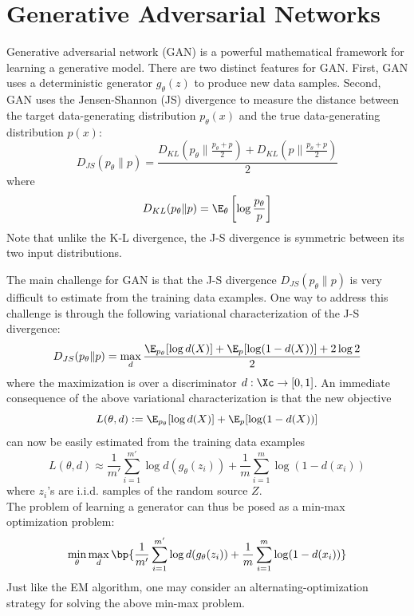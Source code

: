 \chapter{Generative Adversarial Networks}

Generative adversarial network (GAN) is a powerful mathematical framework for learning a generative model. There are two distinct features for GAN. First, GAN uses a deterministic generator $g_\theta(z)$ to produce new data samples.
Second, GAN uses the Jensen-Shannon (JS) divergence to measure the distance between the target data-generating distribution $p_\theta(x)$ and the true data-generating distribution $p(x)$:
\[
    D_{JS}(p_\theta \| p) = \frac{D_{KL}(p_\theta \| \frac{p_\theta + p}{2}) + D_{KL}(p \| \frac{p_\theta + p}{2})}{2}
\]
where
\[
    D_{KL}(p_\theta \| p) = \E_\theta \left[ \log \frac{p_\theta}{p} \right]
\]
Note that unlike the K-L divergence, the J-S divergence is symmetric between its two input distributions.

The main challenge for GAN is that the J-S divergence $D_{JS}(p_\theta \| p)$ is very difficult to estimate from the training data examples. One way to address this challenge is through the following variational characterization of the J-S divergence:
\[
    D_{JS}(p_\theta \| p) = \max_{d} \frac{\E_{p_{\theta}}[\log d(X)] + \E_p [\log(1 - d(X))] + 2\log 2}{2}
\]
where the maximization is over a discriminator $d : \Xc \to [0, 1]$. An immediate consequence of the above variational
characterization is that the new objective
\[
    L(\theta, d) := \E_{p_\theta} [\log d(X)] + \E_p [\log(1 - d(X))]
\]
can now be easily estimated from the training data examples
\[
    L(\theta, d) \approx \frac{1}{m'} \sum_{i=1}^{m'} \log d(g_\theta(z_i)) + \frac{1}{m} \sum_{i=1}^m \log(1 - d(x_i))
\]
where $z_i$'s are i.i.d. samples of the random source $Z$. \\

\noindent The problem of learning a generator can thus be posed as a min-max optimization problem:
\[
    \min_{\theta} \max_{d} \bp{\frac{1}{m'} \sum_{i=1}^{m'} \log d(g_\theta(z_i)) + \frac{1}{m} \sum_{i=1}^{m} \log(1 - d(x_i)) }
\]
Just like the EM algorithm, one may consider an alternating-optimization strategy for solving the above min-max problem.


